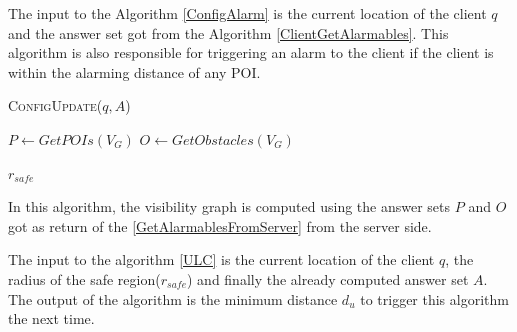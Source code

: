 \documentclass{sig-alternate}
\begin{document}
The input to the Algorithm \ref{ConfigAlarm} is the current location of the client $q$ and the answer set got from the Algorithm \ref{ClientGetAlarmables}. This algorithm is also responsible for triggering an alarm to the client if the client is within the alarming distance of any POI.
\begin{algorithm}
\caption{\textsc{ConfigUpdate}($q, A$)}
\label{ConfigAlarm}

    
    $P \gets GetPOIs(V_G)$\;
    $O \gets GetObstacles(V_G)$\;
    
    \Return $r_{safe}$

\end{algorithm}

In this algorithm, the visibility graph is computed using the answer sets $P$ and $O$ got as return of the \ref{GetAlarmablesFromServer} from the server side.

%


The input to the algorithm \ref{ULC} is the current location of the client $q$, the radius of the safe region($r_{safe}$) and finally the already computed answer set $A$. The output of the algorithm is the minimum distance $d_u$ to trigger this algorithm the next time.
\end{document}
